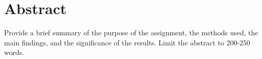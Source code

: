\section{Abstract}

Provide a brief summary of the purpose of the assignment, the methods used, the main findings, and the significance of the results. Limit the abstract to 200-250 words.